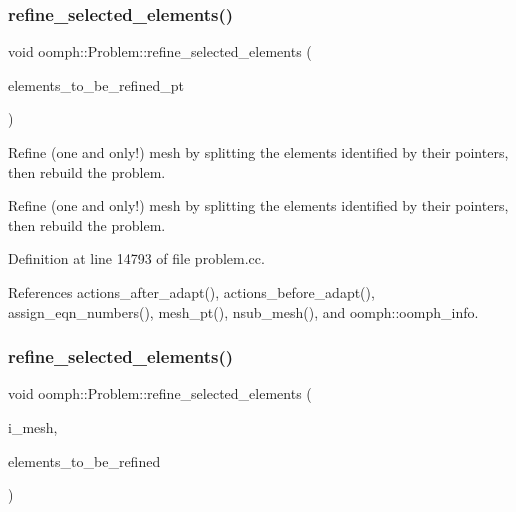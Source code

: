 \subsubsection{\texorpdfstring{refine\+\_\+selected\+\_\+elements()}{refine\_selected\_elements()}\hspace{0.1cm}{\footnotesize\ttfamily [2/6]}}
{\footnotesize\ttfamily void oomph\+::\+Problem\+::refine\+\_\+selected\+\_\+elements (\begin{DoxyParamCaption}\item[{const \hyperlink{classoomph_1_1Vector}{Vector}$<$ \hyperlink{classoomph_1_1RefineableElement}{Refineable\+Element} $\ast$$>$ \&}]{elements\+\_\+to\+\_\+be\+\_\+refined\+\_\+pt }\end{DoxyParamCaption})}



Refine (one and only!) mesh by splitting the elements identified by their pointers, then rebuild the problem. 

Refine (one and only!) mesh by splitting the elements identified by their pointers, then rebuild the problem. 

Definition at line 14793 of file problem.\+cc.



References actions\+\_\+after\+\_\+adapt(), actions\+\_\+before\+\_\+adapt(), assign\+\_\+eqn\+\_\+numbers(), mesh\+\_\+pt(), nsub\+\_\+mesh(), and oomph\+::oomph\+\_\+info.

\mbox{\label{classoomph_1_1Problem_af2bd42a9612a31041b9d607340c6d68c}} 
\subsubsection{\texorpdfstring{refine\+\_\+selected\+\_\+elements()}{refine\_selected\_elements()}\hspace{0.1cm}{\footnotesize\ttfamily [3/6]}}
{\footnotesize\ttfamily void oomph\+::\+Problem\+::refine\+\_\+selected\+\_\+elements (\begin{DoxyParamCaption}\item[{const unsigned \&}]{i\+\_\+mesh,  }\item[{const \hyperlink{classoomph_1_1Vector}{Vector}$<$ unsigned $>$ \&}]{elements\+\_\+to\+\_\+be\+\_\+refined }\end{DoxyParamCaption})}



